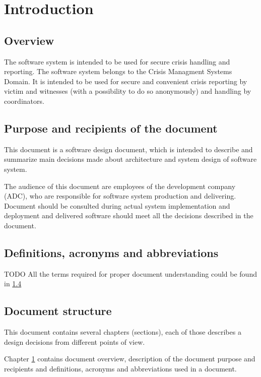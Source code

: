 \chapter{Introduction}
\label{chap:introduction}


\section{Overview}
The \mysystemname software system is intended to be used for secure crisis
handling and reporting.
The \mysystemname software system belongs to the Crisis Managment Systems
Domain. It is intended to be used for secure and convenient crisis reporting by
victim and witnesses (with a possibility to do so anonymously) and handling by
coordinators.



\section{Purpose and recipients of the document}
This document is a software design document, which is intended to describe and
summarize main decisions made about architecture and system design of
\mysystemname software system.

The audience of this document are employees of the development company (ADC),
who are responsible for \mysystemname software system production and
delivering. Document should be consulted during actual system implementation
and deployment and delivered software should meet all the decisions described in
the document.

\section{Definitions, acronyms and abbreviations}
TODO
All the terms required for proper document understanding could be found in \ref{}



  
\section{Document structure} 
This document contains several chapters (sections), each of those describes
a \mysystemname design decisions from different points of view.

Chapter \ref{chap:introduction} contains document overview, description of the
document purpose and recipients and definitions, acronyms and abbreviations  used in a document.

